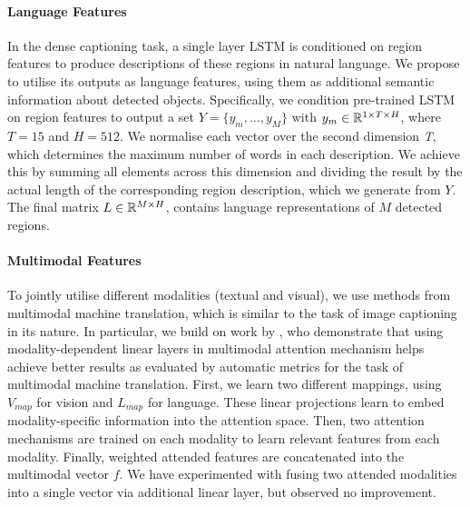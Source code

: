 \documentclass[11pt,a4paper]{article}
\newcommand{\kibitz}[2]{\ifnum\Comments=1\textcolor{#1}{#2}\fi}
\newcommand{\nikolai}[1]{\kibitz{red}   {[Nikolai: #1]}}
\newcommand{\R}{\mathbb{R}}
\begin{document}
\paragraph{Language Features}
In the dense captioning task, a single layer LSTM is conditioned on region features to produce descriptions of these regions in natural language.
We propose to utilise its outputs as language features, using them as additional semantic information about detected objects.
Specifically, we condition pre-trained LSTM on region features to output a set ${Y = \{y_m, ..., y_M\}}$ with $y_m \in \R\sp{1 \times T \times H}$, where $T=15$ and $H=512$.
We normalise each vector over the second dimension \textit{T}, which determines the maximum number of words in each description.
We achieve this by summing all elements across this dimension and dividing the result by the actual length of the corresponding region description, which we generate from $Y$.
The final matrix $L \in \R\sp{M \times H}$, contains language representations of $M$ detected regions.


\paragraph{Multimodal Features}
To jointly utilise different modalities (textual and visual), we use methods from multimodal machine translation, which is similar to the task of image captioning in its nature.
In particular, we build on work by , who demonstrate that using modality-dependent linear layers in multimodal attention mechanism helps achieve better results as evaluated by automatic metrics for the task of multimodal machine translation.
First, we learn two different mappings, using $V_{map}$ for vision and $L_{map}$ for language.
These linear projections learn to embed modality-specific information into the attention space.
Then, two attention mechanisms are trained on each modality to learn relevant features from each modality.
Finally, weighted attended features are concatenated into the multimodal vector $f$.
We have experimented with fusing two attended modalities into a single vector via additional linear layer, but observed no improvement.
\end{document}
